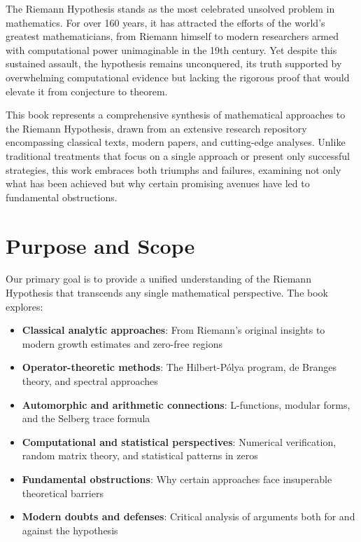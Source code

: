 
The Riemann Hypothesis stands as the most celebrated unsolved problem in mathematics. For over 160 years, it has attracted the efforts of the world's greatest mathematicians, from Riemann himself to modern researchers armed with computational power unimaginable in the 19th century. Yet despite this sustained assault, the hypothesis remains unconquered, its truth supported by overwhelming computational evidence but lacking the rigorous proof that would elevate it from conjecture to theorem.

This book represents a comprehensive synthesis of mathematical approaches to the Riemann Hypothesis, drawn from an extensive research repository encompassing classical texts, modern papers, and cutting-edge analyses. Unlike traditional treatments that focus on a single approach or present only successful strategies, this work embraces both triumphs and failures, examining not only what has been achieved but why certain promising avenues have led to fundamental obstructions.

\section*{Purpose and Scope}

Our primary goal is to provide a unified understanding of the Riemann Hypothesis that transcends any single mathematical perspective. The book explores:

\begin{itemize}
\item \textbf{Classical analytic approaches}: From Riemann's original insights to modern growth estimates and zero-free regions
\item \textbf{Operator-theoretic methods}: The Hilbert-P\'olya program, de Branges theory, and spectral approaches
\item \textbf{Automorphic and arithmetic connections}: L-functions, modular forms, and the Selberg trace formula  
\item \textbf{Computational and statistical perspectives}: Numerical verification, random matrix theory, and statistical patterns in zeros
\item \textbf{Fundamental obstructions}: Why certain approaches face insuperable theoretical barriers
\item \textbf{Modern doubts and defenses}: Critical analysis of arguments both for and against the hypothesis
\end{itemize}

